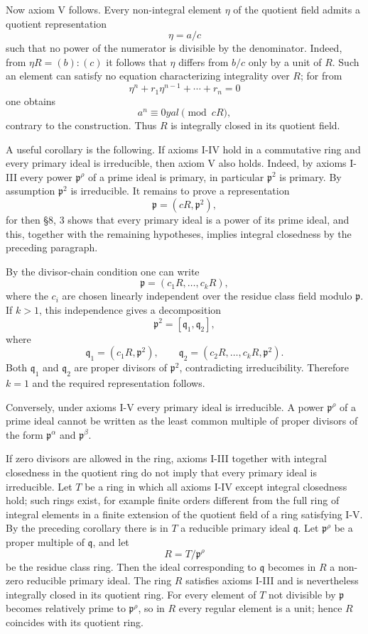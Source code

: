 \documentclass[11pt]{article}
\begin{document}
Now axiom V follows. Every non-integral element \(\eta\) of the quotient
field admits a quotient representation \[
  \eta=a/c
\] such that no power of the numerator is divisible by the denominator.
Indeed, from \(\eta R=(b):(c)\) it follows that \(\eta\) differs from
\(b/c\) only by a unit of \(R\). Such an element can satisfy no equation
characterizing integrality over \(R\); for from \[
  \eta^n+r_1\eta^{n-1}+\cdots+r_n=0
\] one obtains \[
  a^n\equiv0
yal\pmod{cR},
\] contrary to the construction. Thus \(R\) is integrally closed in its
quotient field.

A useful corollary is the following. If axioms I-IV hold in a
commutative ring and every primary ideal is irreducible, then axiom V
also holds. Indeed, by axioms I-III every power \(\mathfrak p^{\rho}\)
of a prime ideal is primary, in particular \(\mathfrak p^2\) is primary.
By assumption \(\mathfrak p^2\) is irreducible. It remains to prove a
representation \[
  \mathfrak p=(cR,\mathfrak p^2),
\] for then §8, 3 shows that every primary ideal is a power of its prime
ideal, and this, together with the remaining hypotheses, implies
integral closedness by the preceding paragraph.

By the divisor-chain condition one can write \[
  \mathfrak p=(c_1R,\ldots,c_kR),
\] where the \(c_i\) are chosen linearly independent over the residue
class field modulo \(\mathfrak p\). If \(k>1\), this independence gives
a decomposition \[
  \mathfrak p^2=[\mathfrak q_1,
\mathfrak q_2],
\] where \[
  \mathfrak q_1=(c_1R,\mathfrak p^2),
  \qquad
  \mathfrak q_2=(c_2R,
\ldots,c_kR,\mathfrak p^2).
\] Both \(\mathfrak q_1\) and \(\mathfrak q_2\) are proper divisors of
\(\mathfrak p^2\), contradicting irreducibility. Therefore \(k=1\) and
the required representation follows.

Conversely, under axioms I-V every primary ideal is irreducible. A power
\(\mathfrak p^{\rho}\) of a prime ideal cannot be written as the least
common multiple of proper divisors of the form \(\mathfrak p^{\alpha}\)
and \(\mathfrak p^{\beta}\).

If zero divisors are allowed in the ring, axioms I-III together with
integral closedness in the quotient ring do not imply that every primary
ideal is irreducible. Let \(T\) be a ring in which all axioms I-IV
except integral closedness hold; such rings exist, for example finite
orders different from the full ring of integral elements in a finite
extension of the quotient field of a ring satisfying I-V. By the
preceding corollary there is in \(T\) a reducible primary ideal
\(\mathfrak q\). Let \(\mathfrak p^{\rho}\) be a proper multiple of
\(\mathfrak q\), and let \[
  R=T/\mathfrak p^{\rho}
\] be the residue class ring. Then the ideal corresponding to
\(\mathfrak q\) becomes in \(R\) a non-zero reducible primary ideal. The
ring \(R\) satisfies axioms I-III and is nevertheless integrally closed
in its quotient ring. For every element of \(T\) not divisible by
\(\mathfrak p\) becomes relatively prime to \(\mathfrak p^{\rho}\), so
in \(R\) every regular element is a unit; hence \(R\) coincides with its
quotient ring.
\end{document}
